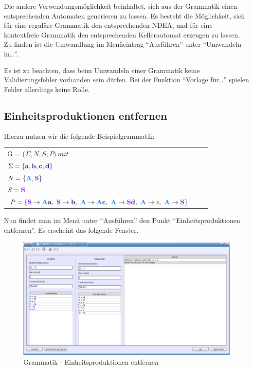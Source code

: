 Die andere Verwendungsmöglichkeit beinhaltet, sich aus der Grammatik einen
ent\-sprechen\-den Automaten generieren zu lassen. Es besteht die Möglichkeit,
sich für eine reguläre Grammatik den entsprechenden NDEA, und für eine
kontextfreie Grammatik den entsprechenden Kellerautomat erzeugen zu
lassen. Zu finden ist die Umwandlung im Menüeintrag "`Ausführen"'
unter "`Umwandeln in\ldots"'.\vspace{10pt}

Es ist zu beachten, dass beim Umwandeln einer Grammatik keine
Validierungsfehler vorhanden sein dürfen. Bei der Funktion "`Vorlage
für\ldots"' spielen Fehler allerdings keine Rolle.

\subsection{Einheitsproduktionen entfernen}

Hierzu nutzen wir die folgende Beispielgrammatik:

\begin{tabular}{lcr}
G = ($\Sigma, N, S, P )\ mit $\\
$\Sigma = \{\TerminalSymbol{a}, \TerminalSymbol{b}, \TerminalSymbol{c},
\TerminalSymbol{d}\}$\\ $N =
\{\NonterminalSymbol{A}, \StartSymbol{S}\}$\\ $S=\StartSymbol{S}$\\
$P = \{\StartSymbol{S} \to \NonterminalSymbol{A}\TerminalSymbol{a},\ \StartSymbol{S} \to \TerminalSymbol{b},\
\NonterminalSymbol{A}	\to \NonterminalSymbol{A}\TerminalSymbol{c},\ \NonterminalSymbol{A} \to \StartSymbol{S}\TerminalSymbol{d},\
\NonterminalSymbol{A} \to \epsilon, \
\NonterminalSymbol{A} \to \StartSymbol{S}\}$\\
\end{tabular}

Nun findet man im Menü unter "`Ausführen"' den Punkt "`Einheitsproduktionen entfernen"'. Es erscheint das folgende Fenster.

\begin{figure}[h]
\begin{center}
\includegraphics[width=12cm]{../images/unit_productions.png}
\caption{Grammatik - Einheitsproduktionen entfernen}
\end{center}
\end{figure}

